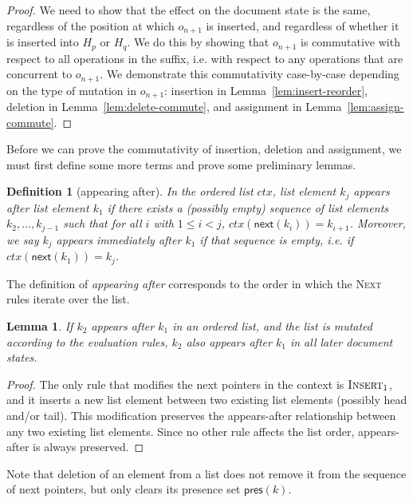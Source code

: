 \documentclass[10pt,journal,compsoc]{IEEEtran}
\newtheorem{definition}{Definition}
\newtheorem{lemma}[theorem]{Lemma}
\begin{document}
\begin{proof}
We need to show that the effect on the document state is the same, regardless of the position at which $o_{n+1}$ is inserted, and regardless of whether it is inserted into $H_p$ or $H_q$. We do this by showing that $o_{n+1}$ is commutative with respect to all operations in the suffix, i.e. with respect to any operations that are concurrent to $o_{n+1}$. We demonstrate this commutativity case-by-case depending on the type of mutation in $o_{n+1}$: insertion in Lemma~\ref{lem:insert-reorder}, deletion in Lemma~\ref{lem:delete-commute}, and assignment in Lemma~\ref{lem:assign-commute}.
\end{proof}

Before we can prove the commutativity of insertion, deletion and assignment, we must first define some more terms and prove some preliminary lemmas.

\begin{definition}[appearing after]
In the ordered list $\mathit{ctx}$, list element $k_j$ \emph{appears after} list element $k_1$ if there exists a (possibly empty) sequence of list elements $k_2, \dots, k_{j-1}$ such that for all $i$ with $1 \le i < j$, $\mathit{ctx}(\mathsf{next}(k_i)) = k_{i+1}$. Moreover, we say $k_j$ appears \emph{immediately after} $k_1$ if that sequence is empty, i.e. if $\mathit{ctx}(\mathsf{next}(k_1)) = k_j$.
\end{definition}

The definition of \emph{appearing after} corresponds to the order in which the \textsc{Next} rules iterate over the list.

\begin{lemma}\label{lem:list-after}
If $k_2$ appears after $k_1$ in an ordered list, and the list is mutated according to the evaluation rules, $k_2$ also appears after $k_1$ in all later document states.
\end{lemma}

\begin{proof}
The only rule that modifies the \textsf{next} pointers in the context is $\textsc{Insert}_1$, and it inserts a new list element between two existing list elements (possibly \textsf{head} and/or \textsf{tail}). This modification preserves the appears-after relationship between any two existing list elements. Since no other rule affects the list order, appears-after is always preserved.
\end{proof}

Note that deletion of an element from a list does not remove it from the sequence of \textsf{next} pointers, but only clears its presence set $\mathsf{pres}(k)$.
\end{document}

